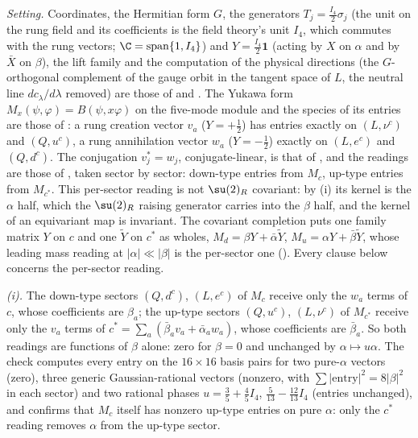 \emph{Setting.} Coordinates, the Hermitian form $G$, the generators $T_{j} = \tfrac{I_{4}}{2}\sigma_{j}$ (the unit on the rung field and its coefficients is the field theory's unit $I_{4}$, which commutes with the rung vectors; $\C = \mathrm{span}\{1, I_{4}\}$) and $Y = \tfrac{I_{4}}{2}\mathbf{1}$ (acting by $X$ on $\alpha$ and by $\bar{X}$ on $\beta$), the lift family and the computation of the physical directions (the $G$-orthogonal complement of the gauge orbit in the tangent space of $L$, the neutral line $dc_{\lambda}/d\lambda$ removed) are those of  and . The Yukawa form $M_{x}(\psi, \varphi) = B(\psi, x\varphi)$ on the five-mode module and the species of its entries are those of : a rung creation vector $v_{a}$ ($Y = +\tfrac12$) has entries exactly on $(L, \nu^{c})$ and $(Q, u^{c})$, a rung annihilation vector $w_{a}$ ($Y = -\tfrac12$) exactly on $(L, e^{c})$ and $(Q, d^{c})$. The conjugation $v_{j}^{*} = w_{j}$, conjugate-linear, is that of , and the readings are those of , taken sector by sector: down-type entries from $M_{c}$, up-type entries from $M_{c^{*}}$. This per-sector reading is not $\su(2)_{R}$ covariant: by (i) its kernel is the $\alpha$ half, which the $\su(2)_{R}$ raising generator carries into the $\beta$ half, and the kernel of an equivariant map is invariant. The covariant completion puts one family matrix $Y$ on $c$ and one $\tilde{Y}$ on $c^{*}$ as wholes, $M_{d} = \beta Y + \bar{\alpha}\tilde{Y}$, $M_{u} = \alpha Y + \bar{\beta}\tilde{Y}$, whose leading mass reading at $|\alpha| \ll |\beta|$ is the per-sector one (). Every clause below concerns the per-sector reading.

\emph{(i).} The down-type sectors $(Q, d^{c})$, $(L, e^{c})$ of $M_{c}$ receive only the $w_{a}$ terms of $c$, whose coefficients are $\beta_{a}$; the up-type sectors $(Q, u^{c})$, $(L, \nu^{c})$ of $M_{c^{*}}$ receive only the $v_{a}$ terms of $c^{*} = \sum_{a}(\bar{\beta}_{a}v_{a} + \bar{\alpha}_{a}w_{a})$, whose coefficients are $\bar{\beta}_{a}$. So both readings are functions of $\beta$ alone: zero for $\beta = 0$ and unchanged by $\alpha \mapsto u\alpha$. The check computes every entry on the $16 \times 16$ basis pairs for two pure-$\alpha$ vectors (zero), three generic Gaussian-rational vectors (nonzero, with $\sum|\text{entry}|^{2} = 8|\beta|^{2}$ in each sector) and two rational phases $u = \tfrac35 + \tfrac45I_{4}$, $\tfrac{5}{13} - \tfrac{12}{13}I_{4}$ (entries unchanged), and confirms that $M_{c}$ itself has nonzero up-type entries on pure $\alpha$: only the $c^{*}$ reading removes $\alpha$ from the up-type sector.

